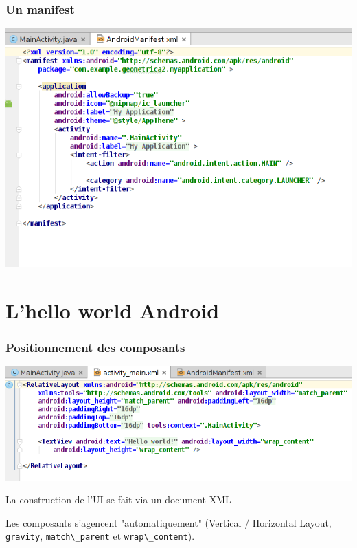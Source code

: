 \documentclass{beamer}
\begin{document}
\begin{frame}
\frametitle{Un manifest}
\begin{center}
\includegraphics[scale=0.4]{manifest.png}
\end{center}

\end{frame}




\section{L'hello world Android}


\begin{frame}
\frametitle{Positionnement des composants}
\begin{center}
\includegraphics[scale=0.4]{layout.png}
\end{center}

\begin{block}{}
La construction de l'UI se fait via un document XML
\end{block}

\begin{block}{}
Les composants s'agencent "automatiquement" (Vertical / Horizontal Layout, \verb!gravity!, \verb!match\_parent! et \verb!wrap\_content!).
\end{block}

\end{frame}
\end{document}
